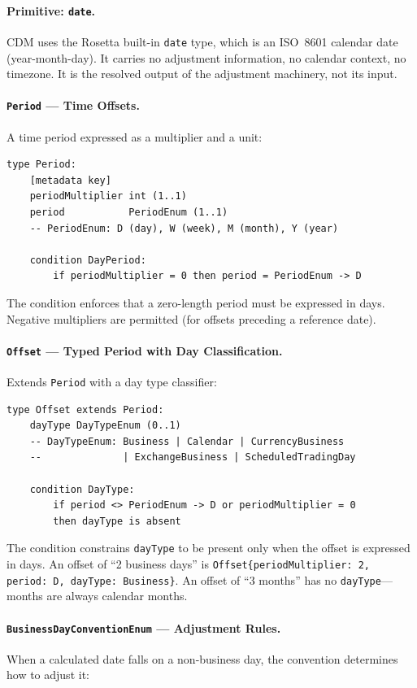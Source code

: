 \documentclass[11pt,a4paper]{article}
\begin{document}
\paragraph{Primitive: \texttt{date}.} CDM uses the Rosetta built-in \texttt{date} type, which is an ISO~8601 calendar date (year-month-day). It carries no adjustment information, no calendar context, no timezone. It is the resolved output of the adjustment machinery, not its input.

\paragraph{\texttt{Period} --- Time Offsets.} A time period expressed as a multiplier and a unit:

\begin{lstlisting}
type Period:
    [metadata key]
    periodMultiplier int (1..1)
    period           PeriodEnum (1..1)
    -- PeriodEnum: D (day), W (week), M (month), Y (year)

    condition DayPeriod:
        if periodMultiplier = 0 then period = PeriodEnum -> D
\end{lstlisting}

\noindent The condition enforces that a zero-length period must be expressed in days. Negative multipliers are permitted (for offsets preceding a reference date).

\paragraph{\texttt{Offset} --- Typed Period with Day Classification.} Extends \texttt{Period} with a day type classifier:

\begin{lstlisting}
type Offset extends Period:
    dayType DayTypeEnum (0..1)
    -- DayTypeEnum: Business | Calendar | CurrencyBusiness
    --              | ExchangeBusiness | ScheduledTradingDay

    condition DayType:
        if period <> PeriodEnum -> D or periodMultiplier = 0
        then dayType is absent
\end{lstlisting}

\noindent The condition constrains \texttt{dayType} to be present only when the offset is expressed in days. An offset of ``2 business days'' is \texttt{Offset\{periodMultiplier: 2, period: D, dayType: Business\}}. An offset of ``3 months'' has no \texttt{dayType}---months are always calendar months.

\paragraph{\texttt{BusinessDayConventionEnum} --- Adjustment Rules.} When a calculated date falls on a non-business day, the convention determines how to adjust it:
\end{document}
